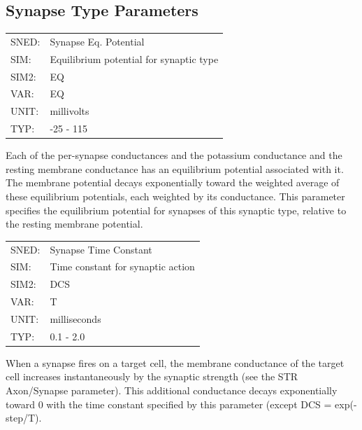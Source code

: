 \documentclass[12pt,openany,oneside]{book}
\begin{document}
\subsection{Synapse Type Parameters}
\label{Synapse Type Parameters}

\begin{flushleft}
\begin{tabular}{@{}ll@{}}
SNED: & Synapse Eq. Potential\\
SIM: & Equilibrium potential for synaptic type\\
SIM2: & EQ\\
VAR: & EQ\\
UNIT: & millivolts\\
TYP: & -25 - 115\\
\end{tabular}
\end{flushleft}
\noindent
Each of the per-synapse conductances and the potassium conductance and
the resting membrane conductance has an equilibrium potential
associated with it.  The membrane potential decays exponentially
toward the weighted average of these equilibrium potentials, each
weighted by its conductance.  This parameter specifies the equilibrium
potential for synapses of this synaptic type, relative to the resting
membrane potential.
\filbreak
\vspace{\baselineskip}

\begin{flushleft}
\begin{tabular}{@{}ll@{}}
SNED: & Synapse Time Constant\\
SIM: & Time constant for synaptic action\\
SIM2: & DCS\\
VAR: & T\\
UNIT: & milliseconds\\
TYP: & 0.1 - 2.0\\
\end{tabular}
\end{flushleft}
\noindent
When a synapse fires on a target cell, the membrane conductance of the
target cell increases instantaneously by the synaptic strength (see
the STR Axon/Synapse parameter).  This additional conductance decays
exponentially toward 0 with the time constant specified by this
parameter (except DCS = exp(-step/T).
\filbreak
\vspace{\baselineskip}
\end{document}
